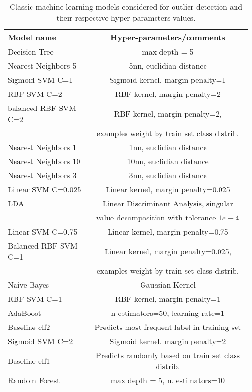 \documentclass[letterpaper, 10pt, conference]{ieeeconf}  %
\begin{document}
\begin{center}
\begin{table}[h!]
\begin{tabular}{lc}
Model name & Hyper-parameters/comments\\ \hline
    Decision Tree &  max depth = 5 \\
    Nearest Neighbors 5 & 5nn, euclidian distance \\
    Sigmoid SVM C=1 & Sigmoid kernel, margin penalty=1\\
    RBF SVM C=2 & RBF  kernel, margin penalty=2 \\
    balanced RBF SVM C=2 & RBF kernel, margin penalty=2, \\ 
    & examples weight by train set class distrib.\\ 
    Nearest Neighbors 1 & 1nn, euclidian distance\\
    Nearest Neighbors 10 & 10nn, euclidian distance \\
    Nearest Neighbors 3 & 3nn, euclidian distance\\
    Linear SVM C=0.025 & Linear kernel, margin penalty=0.025\\
    LDA & Linear Discriminant Analysis, singular \\
    & value decomposition with tolerance $1e-4$\\
    Linear SVM C=0.75 & Linear kernel, margin penalty=0.75\\
    Balanced RBF SVM C=1 & Linear kernel, margin penalty=0.025, \\
    	& examples weight by train set class distrib.\\
    Naive Bayes & Gaussian Kernel\\
    RBF SVM C=1 & RBF kernel, margin penalty=1\\
    AdaBoost & n estimators=50, learning rate=1 \\
    Baseline clf2 & Predicts most frequent label in training set\\
    Sigmoid SVM C=2 & Sigmoid kernel, margin penalty=2 \\
    Baseline clf1 & Predicts randomly based on train set class distrib.\\
    Random Forest & max depth = 5, n. estimators=10 \\
\end{tabular}
\caption{\label{table-classic-models} Classic machine learning models considered for outlier detection and their respective hyper-parameters values.}
\end{table}
\end{center}
\end{document}
